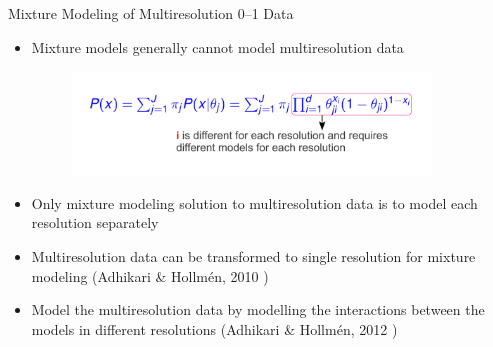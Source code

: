 \documentclass[first=dgreen,second=purple,logo=redexc]{aaltoslides}
\newcommand\FrameText[1]{%
  \begin{textblock*}{0.98\textwidth}(0.2\textwidth,0.95\textheight)
    \textcolor {blue}{\scriptsize\raggedright #1\hspace{0.1\textwidth}}
  \end{textblock*}}
\begin{document}
\begin{frame} {Mixture Modeling of Multiresolution 0--1 Data} 
\small
\begin{itemize}\setlength{\itemsep}{4mm}
    \item Mixture models generally cannot model multiresolution data
    
    \vspace{-2mm}
    
      \begin{figure}
      \centering
      \includegraphics[trim=1cm 1.3cm 1cm 1.3cm, clip=true, width=0.9\textwidth]{figures/multieq}
      \end{figure}
      
          \vspace{-2mm}

     \item Only mixture modeling solution to multiresolution data is to model each resolution separately 
     \item Multiresolution data can be transformed to single resolution for mixture modeling (Adhikari \& Hollm\'en, 2010 )
     \item Model the multiresolution data by modelling the interactions between the models in different resolutions (Adhikari \& Hollm\'en, 2012 )
\end{itemize}
\end{frame}


\end{document}

